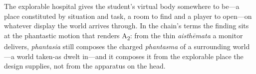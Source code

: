 The explorable hospital gives the student's virtual body somewhere to
be---a place constituted by situation and task, a room to find and a
player to open---on whatever display the world arrives through. In the
chain's terms the finding sits at the phantastic motion that renders
A\textsubscript{2}: from the thin \textit{aisth\=emata} a monitor
delivers, \textit{phantasia} still composes the charged
\textit{phantasma} of a surrounding world---a world taken-as dwelt
in---and it composes it from the explorable place the design supplies,
not from the apparatus on the head.
